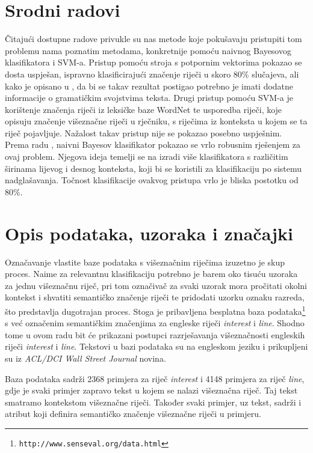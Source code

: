 \documentclass[10pt, a4paper]{article}
\begin{document}
\section{Srodni radovi}
Čitajući dostupne radove privukle su nas metode koje
pokušavaju pristupiti tom problemu nama poznatim metodama,
konkretnije pomoću naivnog Bayesovog klasifikatora i SVM-a.
Pristup pomoću stroja s potpornim vektorima pokazao se dosta
uspješan, ispravno klasificirajući značenje riječi
u skoro 80\% slučajeva, ali kako je opisano u \citep{lee-etc}, da bi se takav
rezultat postigao
potrebno je imati dodatne informacije
o gramatičkim svojstvima teksta. Drugi pristup
pomoću SVM-a je korištenje značenja  riječi
iz leksičke baze WordNet \citep{buscaldi-etc} te usporedba riječi, koje opisuju
značenje višeznačne riječi u rječniku, s riječima
iz konteksta u kojem se ta riječ pojavljuje. Nažalost takav pristup
nije se pokazao posebno uspješnim.
Prema radu \citep{pedersen}, naivni Bayesov klasifikator
pokazao se vrlo robusnim rješenjem za ovaj problem.
Njegova ideja temelji se na izradi više klasifikatora s različitim
širinama lijevog i desnog konteksta,
koji bi se koristili za klasifikaciju po sistemu nadglašavanja.
Točnost klasifikacije ovakvog pristupa vrlo je bliska postotku od 80\%.

\section{Opis podataka, uzoraka i značajki}
Označavanje vlastite baze podataka s višeznačnim riječima izuzetno je
skup proces. Naime za relevantnu klasifikaciju potrebno je barem
oko tisuću uzoraka za jednu višeznačnu riječ, pri tom
označivač za svaki uzorak mora pročitati okolni kontekst i 
shvatiti semantičko značenje riječi te pridodati uzorku oznaku razreda,
što predstavlja dugotrajan proces. Stoga je pribavljena besplatna
baza podataka\footnote{\texttt{http://www.senseval.org/data.html}} s već označenim semantičkim
značenjima za engleske riječi \emph{interest} i \emph{line}. Shodno tome u ovom radu bit će prikazani
postupci razrješavanja višeznačnosti engleskih riječi \emph{interest} i \emph{line}.
Tekstovi u bazi podataka su na engleskom jeziku
i prikupljeni su iz \emph{ACL/DCI Wall Street Journal} novina.

Baza podataka sadrži 2368 primjera za riječ \emph{interest} i 4148 primjera za riječ \emph{line},
gdje je svaki primjer zapravo tekst u kojem se nalazi višeznačna riječ. Taj tekst smatramo
kontekstom višeznačne riječi. Također svaki primjer, uz tekst, sadrži i atribut koji 
definira semantičko značenje višeznačne riječi u primjeru.
\end{document}
